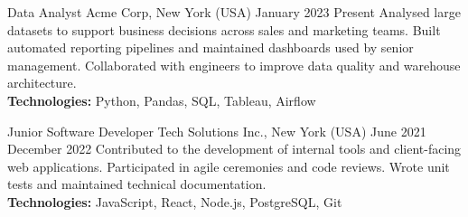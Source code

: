 %
%


\cvexperience
  {Data Analyst}
  {Acme Corp, New York (USA)}
  {January 2023}
  {Present}
  {Analysed large datasets to support business decisions across sales and marketing teams.
   Built automated reporting pipelines and maintained dashboards used by senior management.
   Collaborated with engineers to improve data quality and warehouse architecture.\\[0.3em]
   \textbf{Technologies:} Python, Pandas, SQL, Tableau, Airflow}

\cvexperience
  {Junior Software Developer}
  {Tech Solutions Inc., New York (USA)}
  {June 2021}
  {December 2022}
  {Contributed to the development of internal tools and client-facing web applications.
   Participated in agile ceremonies and code reviews. Wrote unit tests and maintained
   technical documentation.\\[0.3em]
   \textbf{Technologies:} JavaScript, React, Node.js, PostgreSQL, Git}
